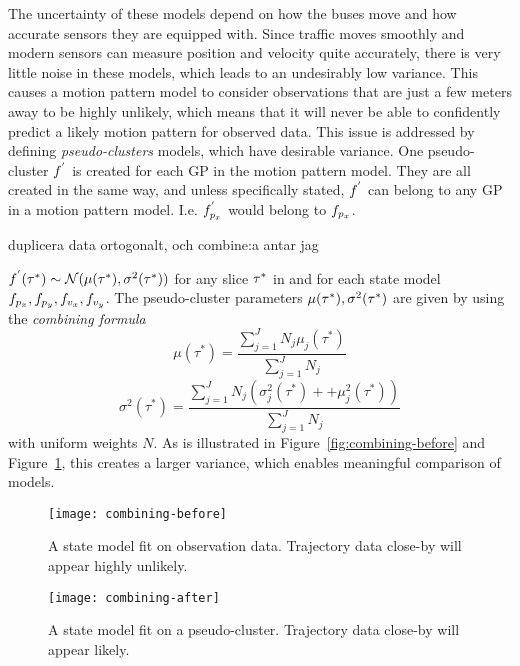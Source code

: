 The uncertainty of these models depend on how the buses move and how
accurate sensors they are equipped with. Since traffic moves smoothly 
and modern sensors can measure position and velocity quite accurately, 
there is very little noise in these models, which leads to an undesirably low variance. 
This causes a motion pattern model to consider observations that are just a few
meters away to be highly unlikely, which means that it will never be
able to confidently predict a likely motion pattern for observed data.
This issue is addressed by defining \textit{pseudo-clusters} models,
which have desirable variance. 
One pseudo-cluster $f^{'}$ is created for each GP in the motion pattern
model. They are all created in the same way, and unless specifically
stated, $f^{'}$ can belong to any GP in a 
motion pattern model. I.e. $f^{'}_{p_x}$ would belong to $f_{p_x}$.

duplicera data ortogonalt, och combine:a antar jag

$f^{'}(\tau^*) \sim \mathcal{N}(\mu(\tau^*), \sigma^2(\tau^*))$ 
for any slice $\tau^*$ in and for each state model
$f_{p_x}, f_{p_y}, f_{v_x}, f_{v_y}$. The
pseudo-cluster parameters $\mu(\tau^*), \sigma^2(\tau^*)$ are given by using the 
\textit{combining formula}~\cite{Tiger2015Jul}
\begin{equation}
  \label{eq:combining-formula-mu}
  \mu(\tau^{*}) = \frac{\sum_{j=1}^{J}N_{j}\mu_j(\tau^{*})}{\sum_{j=1}^{J}N_j}
\end{equation}
\begin{equation}
  \label{eq:combining-formula-sigma}
  \sigma^2(\tau^{*}) =
  \frac{\sum_{j=1}^{J}N_{j}(\sigma^2_j(\tau^{*}) + + \mu_j^2(\tau^{*}))}{\sum_{j=1}^{J}N_j}
\end{equation}
with uniform weights $N$. As is illustrated in Figure~\ref{fig:combining-before} and
Figure~\ref{fig:combining-after}, this creates a larger variance, 
which enables meaningful comparison of models.
\begin{figure}
  \begin{minipage}{.46\textwidth}
    \texttt{[image: combining-before]}
    \caption{A state model fit on observation data. Trajectory data close-by
    will appear highly unlikely.}\label{fig:combining-before}
  \end{minipage}
  \hspace{5pt}
  \begin{minipage}{.46\textwidth}
    \texttt{[image: combining-after]}
    \caption{A state model fit on a pseudo-cluster. Trajectory data close-by
    will appear likely.}\label{fig:combining-after}
  \end{minipage}
\end{figure}

